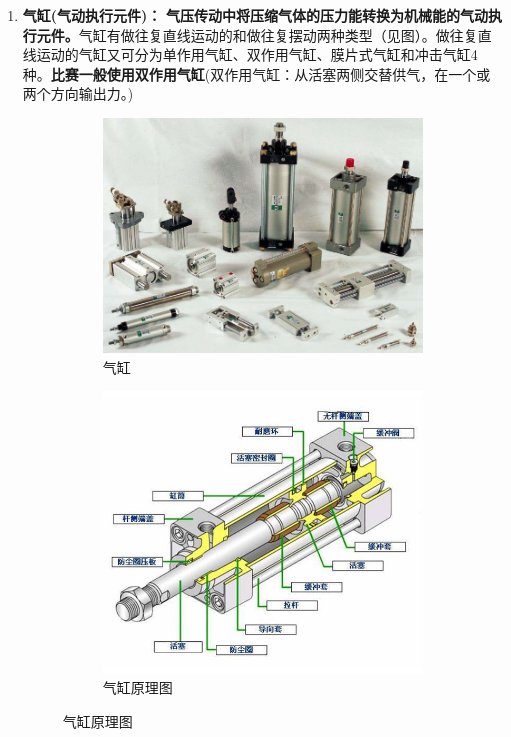 \documentclass[UTF8]{article} %
\begin{document}
\begin{enumerate}
  \item \textbf{气缸(气动执行元件)：} \textbf{气压传动中将压缩气体的压力能转换为机械能的气动执行元件。}气缸有做往复直线运动的和做往复摆动两种类型（见图）。做往复直线运动的气缸又可分为单作用气缸、双作用气缸、膜片式气缸和冲击气缸4种。\textbf{比赛一般使用双作用气缸}(双作用气缸：从活塞两侧交替供气，在一个或两个方向输出力。)

  \begin{figure}[H]
    \centering
    \begin{subfigure}[b]{0.4\textwidth}
           \centering
           \includegraphics[width=\textwidth]{qi6.png}
            \caption{气缸}
    \end{subfigure}
    \quad
    \begin{subfigure}[b]{0.37\textwidth}
            \centering
            \includegraphics[width=\textwidth]{qi7.png}
            \caption{气缸原理图}
    \end{subfigure}
  \end{figure}

\end{enumerate}
\end{document}
